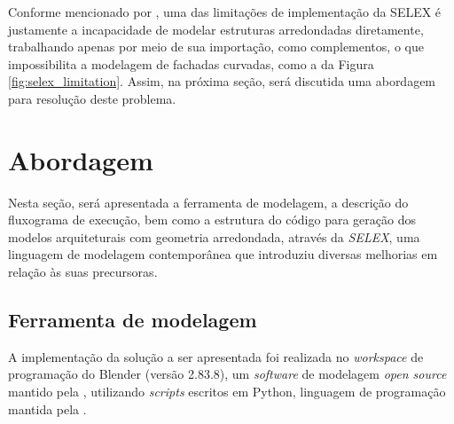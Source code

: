 Conforme mencionado por , uma das limitações de implementação da \gls{SELEX} é justamente a incapacidade de modelar estruturas arredondadas diretamente, trabalhando apenas por meio de sua importação, como complementos, o que impossibilita a modelagem de fachadas curvadas, como a da Figura \ref{fig:selex_limitation}. Assim, na próxima seção, será discutida uma abordagem para resolução deste problema.

\begin{figure}[h!]
	\centering
	\captionsetup{width=15cm}
	{}	
\end{figure}

\section{Abordagem}
\label{sec:abordagem}

Nesta seção, será apresentada a ferramenta de modelagem, a descrição do fluxograma de execução, bem como a estrutura do código para geração dos modelos arquiteturais com geometria arredondada, através da \textit{SELEX}, uma linguagem de modelagem contemporânea que introduziu diversas melhorias em relação às suas precursoras.

\subsection{Ferramenta de modelagem}
\label{sec:ferramenta_modelagem}

A implementação da solução a ser apresentada foi realizada no \textit{workspace} de programação do Blender (versão 2.83.8), um \textit{software} de modelagem \textit{open source} mantido pela , utilizando \textit{scripts} escritos em Python, linguagem de programação mantida pela .

